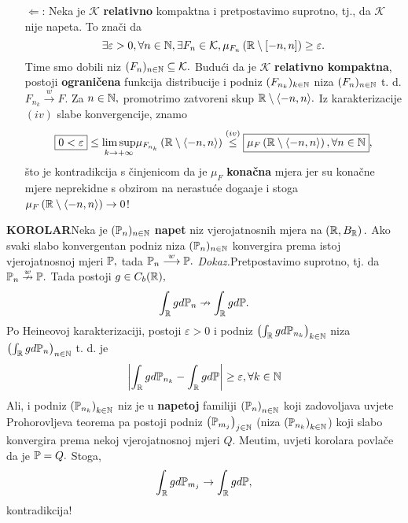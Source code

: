 \documentclass{article}
\begin{document}
\begin{enumerate}
    \item[\(\boxed{\Leftarrow}\):] Neka je \(\mathcal K\) \textbf{relativno} kompaktna i pretpostavimo suprotno, tj., da \(\mathcal K\) nije napeta. To znači da \[\exists\varepsilon>0,\forall n\in\Bbb N,\exists F_n\in\mathcal K,\mu_{F_n}\left(\Bbb R\setminus[-n,n]\right)\ge\varepsilon.\] Time smo dobili niz \((F_n)_{n\in\Bbb N}\subseteq\mathcal K.\) Budući da je \(\mathcal K\) \textbf{relativno kompaktna}, postoji \textbf{ograničena} funkcija distribucije i podniz \((F_{n_k})_{k\in\Bbb N}\) niza \((F_n)_{n\in\Bbb N}\) t. d. \(F_{n_k}\overset{w}{\longrightarrow}F.\) Za \(n\in\Bbb N,\) promotrimo zatvoreni skup \(\Bbb R\setminus\langle -n,n\rangle.\) Iz karakterizacije \((iv)\) slabe konvergencije, znamo \[\boxed{0<\varepsilon}\le\underset{k\to+\infty}{\lim\sup }\mu_{F_{n_k}}\left(\Bbb R\setminus\langle-n,n\rangle\right)\overset{(iv)}{\le}\boxed{\mu_F\left(\Bbb R\setminus\langle-n,n\rangle\right),\forall n\in\Bbb N},\] što je kontradikcija s činjenicom da je \(\mu_F\) \textbf{konačna} mjera jer su konačne mjere neprekidne s obzirom na nerastuće doga\dj{}aje i stoga \(\mu_F\left(\Bbb R\setminus\langle-n,n\rangle\right)\to0\)!   
\end{enumerate}
\textbf{KOROLAR}\newline Neka je \((\Bbb P_n)_{n\in\Bbb N}\) \textbf{napet} niz vjerojatnosnih mjera na \(\left(\Bbb R,B_{\Bbb R}\right).\) Ako svaki slabo konvergentan podniz niza \((\Bbb P_n)_{n\in\Bbb N}\) konvergira prema istoj vjerojatnosnoj mjeri \(\Bbb P,\) tada \(\Bbb P_n\overset{w}{\longrightarrow}\Bbb P.\)\newline\newline
\textit{Dokaz.}\newline Pretpostavimo suprotno, tj. da \(\Bbb P_n\overset{w}{\nrightarrow}\Bbb P.\) Tada postoji \(g\in C_b(\Bbb R),\) \[\int_{\Bbb R}gd\Bbb P_n\nrightarrow\int_{\Bbb R}gd\Bbb P.\] Po Heineovoj karakterizaciji, postoji \(\varepsilon>0\) i podniz \(\left(\int_{\Bbb R}gd\Bbb P_{n_k}\right)_{k\in\Bbb N}\) niza \(\left(\int_{\Bbb R}gd\Bbb P_n\right)_{n\in\Bbb N}\) t. d. je \[\left|\int_{\Bbb R}gd\Bbb P_{n_k}-\int_{\Bbb R}gd\Bbb P\right|\ge\varepsilon,\forall k\in\Bbb N\] Ali, i podniz \(\left(\Bbb P_{n_k}\right)_{k\in\Bbb N}\) niz je u \textbf{napetoj} familiji \(\left(\Bbb P_n\right)_{n\in\Bbb N}\) koji zadovoljava uvjete Prohorovljeva teorema pa postoji podniz \(\left(\Bbb P_{m_j}\right)_{j\in\Bbb N}\) (niza \(\left(\Bbb P_{n_k}\right)_{k\in\Bbb N}\)) koji slabo konvergira prema nekoj vjerojatnosnoj mjeri \(Q.\)  Me\dj{}utim, uvjeti korolara povlače da je \(\Bbb P=Q.\) Stoga, \[\int_{\Bbb R}gd\Bbb P_{m_j}\to\int_{\Bbb R}gd\Bbb P,\] kontradikcija!\newline\newline
\end{document}

